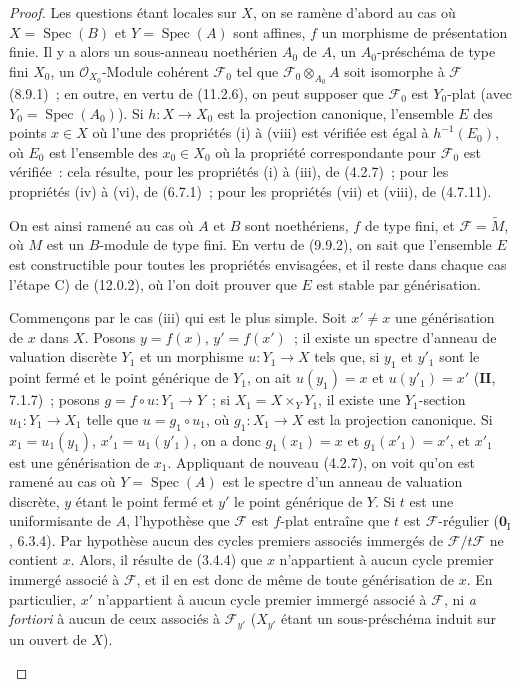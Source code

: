 \begin{proof}
Les questions étant locales sur $X$, on se ramène d'abord au cas où
$X=\operatorname{Spec}(B)$ et $Y=\operatorname{Spec}(A)$ sont affines, $f$ un
morphisme de présentation finie. Il y a alors un sous-anneau noethérien $A_0$
de $A$, un $A_0$-préschéma de type fini $X_0$, un
$\mathcal O_{X_0}$-Module cohérent $\mathcal F_0$ tel que
$\mathcal F_0\otimes_{A_0}A$ soit isomorphe à $\mathcal F$ (8.9.1)~; en
outre, en vertu de (11.2.6), on peut supposer que $\mathcal F_0$ est
$Y_0$-plat (avec $Y_0=\operatorname{Spec}(A_0)$). Si $h:X\to X_0$ est la
projection canonique, l'ensemble $E$ des points $x\in X$ où l'une des
propriétés (i) à (viii) est vérifiée est égal à $h^{-1}(E_0)$, où $E_0$ est
l'ensemble des $x_0\in X_0$ où la propriété correspondante pour $\mathcal F_0$
est vérifiée~: cela résulte, pour les propriétés (i) à (iii), de (4.2.7)~; pour
les propriétés (iv) à (vi), de (6.7.1)~; pour les propriétés (vii) et (viii),
de (4.7.11).

On est ainsi ramené au cas où $A$ et $B$ sont noethériens, $f$ de type fini,
et $\mathcal F=\widetilde M$, où $M$ est un $B$-module de type fini. En vertu
de (9.9.2), on sait que l'ensemble $E$ est constructible pour toutes les
propriétés envisagées, et il reste dans chaque cas l'étape C) de (12.0.2), où
l'on doit prouver que $E$ est stable par générisation.

\begin{env}[12.1.1.1]
\label{IV.12.1.1.1-fr}
Commençons par le cas (iii) qui est le plus simple. Soit $x'\ne x$ une
générisation de $x$ dans $X$. Posons $y=f(x)$, $y'=f(x')$~; il existe un
spectre d'anneau de valuation discrète $Y_1$ et un morphisme $u:Y_1\to X$ tels
que, si $y_1$ et $y'_1$ sont le point fermé et le point générique de $Y_1$, on
ait $u(y_1)=x$ et $u(y'_1)=x'$ ($\mathbf{II}$, 7.1.7)~; posons
$g=f\circ u:Y_1\to Y$~; si $X_1=X\times_YY_1$, il existe une $Y_1$-section
$u_1:Y_1\to X_1$ telle que $u=g_1\circ u_1$, où $g_1:X_1\to X$ est la
projection canonique. Si $x_1=u_1(y_1)$, $x'_1=u_1(y'_1)$, on a donc
$g_1(x_1)=x$ et $g_1(x'_1)=x'$, et $x'_1$ est une générisation de $x_1$.
Appliquant de nouveau (4.2.7), on voit
qu'on est ramené au cas où $Y=\operatorname{Spec}(A)$ est le spectre d'un
anneau de valuation discrète, $y$ étant le point fermé et $y'$ le point
générique de $Y$. Si $t$ est une uniformisante de $A$, l'hypothèse que
$\mathcal F$ est $f$-plat entraîne que $t$ est $\mathcal F$-régulier
($\mathbf 0_{\mathrm I}$, 6.3.4). Par hypothèse aucun des cycles premiers
associés immergés de $\mathcal F/t\mathcal F$ ne contient $x$. Alors, il
résulte de (3.4.4) que $x$ n'appartient à aucun cycle premier immergé associé à
$\mathcal F$, et il en est donc de même de toute générisation de $x$. En
particulier, $x'$ n'appartient à aucun cycle premier immergé associé à
$\mathcal F$, ni \emph{a fortiori} à aucun de ceux associés à
$\mathcal F_{y'}$ ($X_{y'}$ étant un sous-préschéma induit sur un ouvert de
$X$).
\end{env}


\end{proof}
